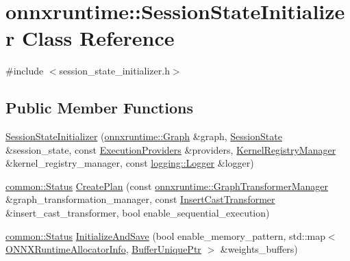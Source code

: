 \hypertarget{classonnxruntime_1_1SessionStateInitializer}{}\section{onnxruntime\+:\+:Session\+State\+Initializer Class Reference}
\label{classonnxruntime_1_1SessionStateInitializer}


{\ttfamily \#include $<$session\+\_\+state\+\_\+initializer.\+h$>$}

\subsection*{Public Member Functions}
\begin{DoxyCompactItemize}
\item 
\mbox{\hyperlink{classonnxruntime_1_1SessionStateInitializer_abc08054b3b6ad95966c05cefc036f63a}{Session\+State\+Initializer}} (\mbox{\hyperlink{classonnxruntime_1_1Graph}{onnxruntime\+::\+Graph}} \&graph, \mbox{\hyperlink{classonnxruntime_1_1SessionState}{Session\+State}} \&session\+\_\+state, const \mbox{\hyperlink{classonnxruntime_1_1ExecutionProviders}{Execution\+Providers}} \&providers, \mbox{\hyperlink{classonnxruntime_1_1KernelRegistryManager}{Kernel\+Registry\+Manager}} \&kernel\+\_\+registry\+\_\+manager, const \mbox{\hyperlink{classonnxruntime_1_1logging_1_1Logger}{logging\+::\+Logger}} \&logger)
\item 
\mbox{\hyperlink{classonnxruntime_1_1common_1_1Status}{common\+::\+Status}} \mbox{\hyperlink{classonnxruntime_1_1SessionStateInitializer_a754eb7134790957b684b9131c010f3f7}{Create\+Plan}} (const \mbox{\hyperlink{classonnxruntime_1_1GraphTransformerManager}{onnxruntime\+::\+Graph\+Transformer\+Manager}} \&graph\+\_\+transformation\+\_\+manager, const \mbox{\hyperlink{classonnxruntime_1_1InsertCastTransformer}{Insert\+Cast\+Transformer}} \&insert\+\_\+cast\+\_\+transformer, bool enable\+\_\+sequential\+\_\+execution)
\item 
\mbox{\hyperlink{classonnxruntime_1_1common_1_1Status}{common\+::\+Status}} \mbox{\hyperlink{classonnxruntime_1_1SessionStateInitializer_a98d629f31578b01f30aa3a176eadd52c}{Initialize\+And\+Save}} (bool enable\+\_\+memory\+\_\+pattern, std\+::map$<$ \mbox{\hyperlink{structONNXRuntimeAllocatorInfo}{O\+N\+N\+X\+Runtime\+Allocator\+Info}}, \mbox{\hyperlink{namespaceonnxruntime_acd830c816d6e0699b671f8ba79bb48f9}{Buffer\+Unique\+Ptr}} $>$ \&weights\+\_\+buffers)
\end{DoxyCompactItemize}


